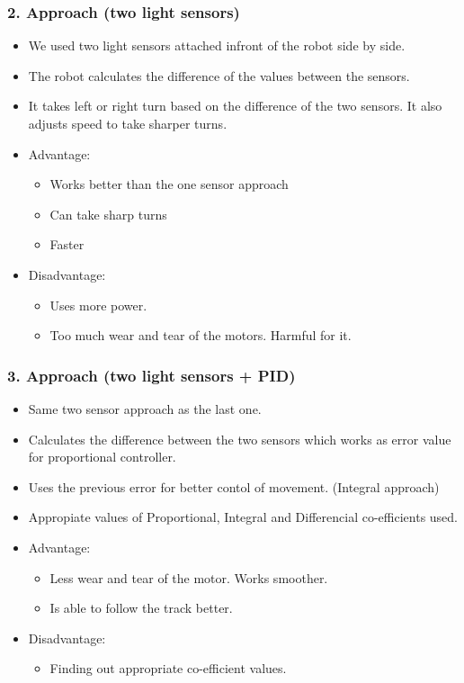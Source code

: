 \documentclass{beamer}
\begin{document}
	\begin{frame}
		\frametitle{2. Approach (two light sensors)}
		\begin{itemize}
			\item We used two light sensors attached infront of the robot side  by side.
			\item The robot calculates the difference of the values between the sensors.
			\item It takes left or right turn based on the difference of the two sensors. It also adjusts speed to take sharper turns.
			\item Advantage:
			\begin{itemize}
				\item Works better than the one sensor approach
				\item Can take sharp turns
				\item Faster
			\end{itemize}
			\item Disadvantage:
			\begin{itemize}
				\item Uses more power.
				\item Too much wear and tear of the motors. Harmful for it.
			\end{itemize}
		\end{itemize}
	\end{frame}
	\begin{frame}
		\frametitle{3. Approach (two light sensors + PID)}
		\begin{itemize}
			\item Same two sensor approach as the last one.
			\item Calculates the difference between the two sensors which works as error value for proportional controller.
			\item Uses the previous error for better contol of movement. (Integral approach)
			\item Appropiate values of Proportional, Integral and Differencial co-efficients used.
			\item Advantage:
			\begin{itemize}
				\item Less wear and tear of the motor. Works smoother.
				\item Is able to follow the track better.
			\end{itemize}
			\item Disadvantage:
			\begin{itemize}
				\item Finding out appropriate co-efficient values.
			\end{itemize}
		\end{itemize} 
	\end{frame}
\end{document}
